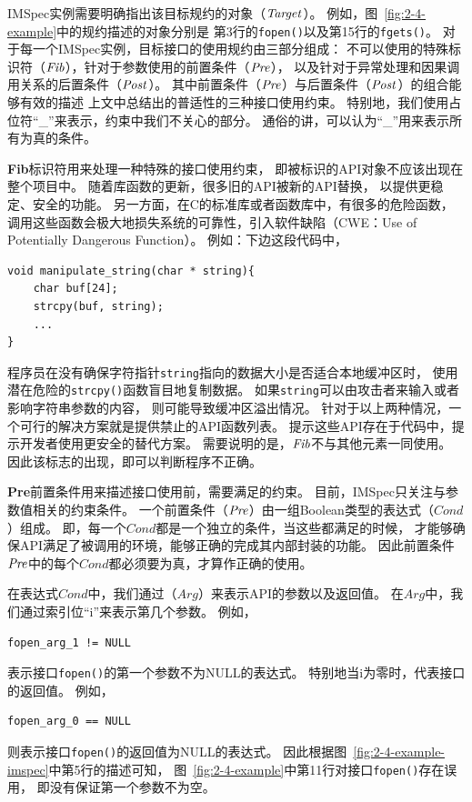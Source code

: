 

IMSpec实例需要明确指出该目标规约的对象（$\mathit{Target}$）。
例如，图~\ref{fig:2-4-example}中的规约描述的对象分别是
第3行的\texttt{fopen()}以及第15行的\texttt{fgets()}。
对于每一个IMSpec实例，目标接口的使用规约由三部分组成：
不可以使用的特殊标识符（$\mathit{Fib}$），针对于参数使用的前置条件（$\mathit{Pre}$），
以及针对于异常处理和因果调用关系的后置条件（$\mathit{Post}$）。
其中前置条件（$\mathit{Pre}$）与后置条件（$\mathit{Post}$）的组合能够有效的描述
上文中总结出的普适性的三种接口使用约束。
特别地，我们使用占位符“\_”来表示，约束中我们不关心的部分。
通俗的讲，可以认为“\_”用来表示所有为真的条件。

\textbf{Fib}标识符用来处理一种特殊的接口使用约束，
即被标识的API对象不应该出现在整个项目中。
随着库函数的更新，很多旧的API被新的API替换，
以提供更稳定、安全的功能。
另一方面，在C的标准库或者函数库中，有很多的危险函数，
调用这些函数会极大地损失系统的可靠性，引入软件缺陷（CWE：Use of Potentially Dangerous Function）。
例如：下边这段代码中，
\begin{lstlisting}[language={[ANSI]C},
basicstyle=\linespread{0.8}\listingsfont,
numbers=none,
xleftmargin=.3\textwidth]
void manipulate_string(char * string){
	char buf[24];
	strcpy(buf, string);
	...
}
\end{lstlisting}
程序员在没有确保字符指针\texttt{string}指向的数据大小是否适合本地缓冲区时，
使用潜在危险的\texttt{strcpy()}函数盲目地复制数据。
如果\texttt{string}可以由攻击者来输入或者影响字符串参数的内容，
则可能导致缓冲区溢出情况。
针对于以上两种情况，一个可行的解决方案就是提供禁止的API函数列表。
提示这些API存在于代码中，提示开发者使用更安全的替代方案。
需要说明的是，$\mathit{Fib}$不与其他元素一同使用。
因此该标志的出现，即可以判断程序不正确。


\textbf{Pre}前置条件用来描述接口使用前，需要满足的约束。
目前，IMSpec只关注与参数值相关的约束条件。
一个前置条件（$\mathit{Pre}$）由一组Boolean类型的表达式（$\mathit{Cond}$）组成。
即，每一个$\mathit{Cond}$都是一个独立的条件，当这些都满足的时候，
才能够确保API满足了被调用的环境，能够正确的完成其内部封装的功能。
因此前置条件$\mathit{Pre}$中的每个$\mathit{Cond}$都必须要为真，才算作正确的使用。

在表达式$\mathit{Cond}$中，我们通过（$\mathit{Arg}$）来表示API的参数以及返回值。
在$\mathit{Arg}$中，我们通过索引位“i”来表示第几个参数。
例如，
\begin{lstlisting}[language={[ANSI]C},
basicstyle=\linespread{0.8}\listingsfont,
numbers=none,
xleftmargin=.3\textwidth]
fopen_arg_1 != NULL
\end{lstlisting}
表示接口\texttt{fopen()}的第一个参数不为NULL的表达式。
特别地当i为零时，代表接口的返回值。
例如，
\begin{lstlisting}[language={[ANSI]C},
basicstyle=\linespread{0.8}\listingsfont,
numbers=none,
xleftmargin=.3\textwidth,]
fopen_arg_0 == NULL
\end{lstlisting}
则表示接口\texttt{fopen()}的返回值为NULL的表达式。
因此根据图~\ref{fig:2-4-example-imspec}中第5行的描述可知，
图~\ref{fig:2-4-example}中第11行对接口\texttt{fopen()}存在误用，
即没有保证第一个参数不为空。


